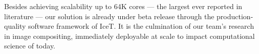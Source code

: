 \documentclass{sig-alternate}
\newcommand*{\lcite}[1]{~\cite{#1}}
\begin{document}
Besides achieving scalability up to 64K cores --- the largest ever 
reported in literature --- our solution is already under beta release 
through the production-quality software framework of IceT.
It is the culmination of our team's research in image compositing, 
immediately deployable at scale to impact computational science of today.

\end{document}

